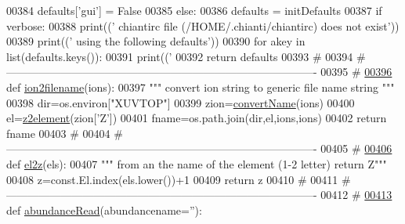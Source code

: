 \begin{DoxyCode}
{{{{00384             defaults[\textcolor{stringliteral}{'gui'}] = \textcolor{keyword}{False}
00385     \textcolor{keywordflow}{else}:
00386         defaults = initDefaults
00387         \textcolor{keywordflow}{if} verbose:
00388             print((\textcolor{stringliteral}{' chiantirc file (/HOME/.chianti/chiantirc) does not exist'}))
00389             print((\textcolor{stringliteral}{' using the following defaults'}))
00390             \textcolor{keywordflow}{for} akey \textcolor{keywordflow}{in} list(defaults.keys()):
00391                 print((\textcolor{stringliteral}{' %
00392     \textcolor{keywordflow}{return} defaults
00393     \textcolor{comment}{#}
00394     \textcolor{comment}{# -------------------------------------------------------------------------------------}
00395     \textcolor{comment}{#}
\hypertarget{__chianti__tools_8py_source_l00396}{}\hyperlink{namespacepyneb_1_1utils_1_1__chianti__tools_ad4bc7b577fd4c3819ceb00b0a444351b}{00396} \textcolor{keyword}{def }\hyperlink{namespacepyneb_1_1utils_1_1__chianti__tools_ad4bc7b577fd4c3819ceb00b0a444351b}{ion2filename}(ions):
00397     \textcolor{stringliteral}{""" convert ion string to generic file name string """}
00398     dir=os.environ[\textcolor{stringliteral}{"XUVTOP"}]
00399     zion=\hyperlink{namespacepyneb_1_1utils_1_1__chianti__tools_a92cf299ad3407ee8923739e2761ab13f}{convertName}(ions)
00400     el=\hyperlink{namespacepyneb_1_1utils_1_1__chianti__tools_a0e092ff402fc0287bcaaed67171934ea}{z2element}(zion[\textcolor{stringliteral}{'Z'}])
00401     fname=os.path.join(dir,el,ions,ions)
00402     \textcolor{keywordflow}{return} fname
00403     \textcolor{comment}{#}
00404     \textcolor{comment}{# -------------------------------------------------------------------------------------}
00405     \textcolor{comment}{#}
\hypertarget{__chianti__tools_8py_source_l00406}{}\hyperlink{namespacepyneb_1_1utils_1_1__chianti__tools_a32ffd2ba65d19385acc6921d77da7976}{00406} \textcolor{keyword}{def }\hyperlink{namespacepyneb_1_1utils_1_1__chianti__tools_a32ffd2ba65d19385acc6921d77da7976}{el2z}(els):
00407     \textcolor{stringliteral}{""" from an the name of the element (1-2 letter) return Z"""}
00408     z=const.El.index(els.lower())+1
00409     \textcolor{keywordflow}{return} z
00410     \textcolor{comment}{#}
00411     \textcolor{comment}{# -------------------------------------------------------------------------------------}
00412     \textcolor{comment}{#}
\hypertarget{__chianti__tools_8py_source_l00413}{}\hyperlink{namespacepyneb_1_1utils_1_1__chianti__tools_a25c22edea4645bdc590eed4a1c86fea8}{00413} \textcolor{keyword}{def }\hyperlink{namespacepyneb_1_1utils_1_1__chianti__tools_a25c22edea4645bdc590eed4a1c86fea8}{abundanceRead}(abundancename=''):
}}}}}
\end{DoxyCode}
